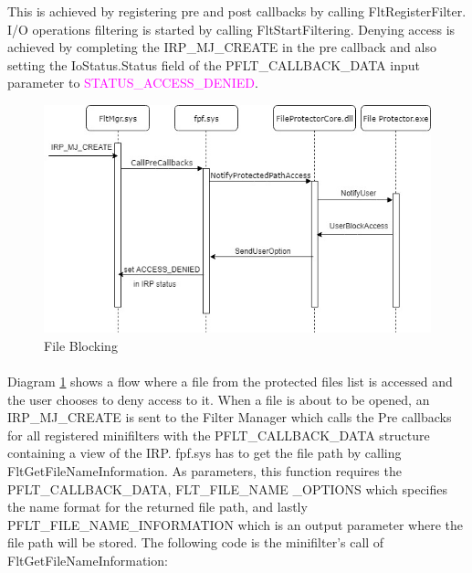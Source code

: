 		
		This is achieved by registering pre and post callbacks by calling FltRegisterFilter. I/O operations filtering is started by calling FltStartFiltering. Denying access is achieved by completing the IRP\_MJ\_CREATE in the pre callback and also setting the IoStatus.Status field of the \textcolor{Emerald} {PFLT\_CALLBACK\_DATA} input parameter to \textcolor{Magenta} {STATUS\_ACCESS\_DENIED}.
		
		\begin{figure}[h!]
			\begin{center}
				\includegraphics[scale=0.7]{images/SequenceDiagram.jpg}
				\caption{File Blocking}
				\label{fig:FPFBlockFileDiagram}
			\end{center}
		\end{figure}
	
		\paragraph{}
		Diagram \ref{fig:FPFBlockFileDiagram} shows a flow where a file from the protected files list is accessed and the user chooses to deny access to it. When a file is about to be opened, an IRP\_MJ\_CREATE is sent to the Filter Manager which calls the Pre callbacks for all registered minifilters with the \textcolor{Emerald} {PFLT\_CALLBACK\_DATA} structure containing a view of the IRP. fpf.sys has to get the file path by calling FltGetFileNameInformation. As parameters, this function requires the \textcolor{Emerald}{PFLT\_CALLBACK\_DATA}, \textcolor{Emerald} {FLT\_FILE\_NAME \_OPTIONS} which specifies the name format for the returned file path, and lastly \textcolor{Emerald} {PFLT\_FILE\_NAME\_INFORMATION} which is an output parameter where the file path will be stored. The following code is the minifilter's call of FltGetFileNameInformation:
		
